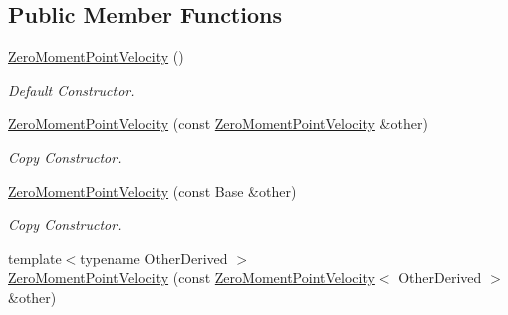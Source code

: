 \subsection*{Public Member Functions}
\begin{DoxyCompactItemize}
\item 
\hyperlink{classow__core_1_1ZeroMomentPointVelocity_a4f49ad7220764676fee3bafd4889166a}{Zero\+Moment\+Point\+Velocity} ()\hypertarget{classow__core_1_1ZeroMomentPointVelocity_a4f49ad7220764676fee3bafd4889166a}{}\label{classow__core_1_1ZeroMomentPointVelocity_a4f49ad7220764676fee3bafd4889166a}

\begin{DoxyCompactList}\small\item\em Default Constructor. \end{DoxyCompactList}\item 
\hyperlink{classow__core_1_1ZeroMomentPointVelocity_ab46d17376e168a62cd86a6548b6094b2}{Zero\+Moment\+Point\+Velocity} (const \hyperlink{classow__core_1_1ZeroMomentPointVelocity}{Zero\+Moment\+Point\+Velocity} \&other)\hypertarget{classow__core_1_1ZeroMomentPointVelocity_ab46d17376e168a62cd86a6548b6094b2}{}\label{classow__core_1_1ZeroMomentPointVelocity_ab46d17376e168a62cd86a6548b6094b2}

\begin{DoxyCompactList}\small\item\em Copy Constructor. \end{DoxyCompactList}\item 
\hyperlink{classow__core_1_1ZeroMomentPointVelocity_a3aff52453f96ec0c698a352057a27028}{Zero\+Moment\+Point\+Velocity} (const Base \&other)\hypertarget{classow__core_1_1ZeroMomentPointVelocity_a3aff52453f96ec0c698a352057a27028}{}\label{classow__core_1_1ZeroMomentPointVelocity_a3aff52453f96ec0c698a352057a27028}

\begin{DoxyCompactList}\small\item\em Copy Constructor. \end{DoxyCompactList}\item 
{\footnotesize template$<$typename Other\+Derived $>$ }\\\hyperlink{classow__core_1_1ZeroMomentPointVelocity_a2867c086c9a0f24eba522e58ea876e2a}{Zero\+Moment\+Point\+Velocity} (const \hyperlink{classow__core_1_1ZeroMomentPointVelocity}{Zero\+Moment\+Point\+Velocity}$<$ Other\+Derived $>$ \&other)\hypertarget{classow__core_1_1ZeroMomentPointVelocity_a2867c086c9a0f24eba522e58ea876e2a}{}\label{classow__core_1_1ZeroMomentPointVelocity_a2867c086c9a0f24eba522e58ea876e2a}


\end{DoxyCompactItemize}
